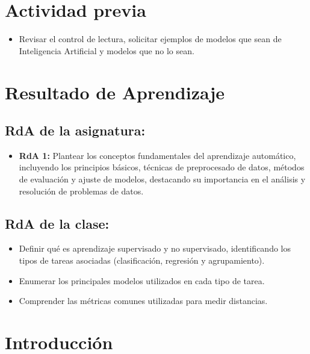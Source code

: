 \documentclass[a4,11pt]{aleph-notas}
\begin{document}
\encabezado

\section*{Actividad previa}

\begin{itemize}
    \item Revisar el control de lectura, solicitar ejemplos de modelos que sean de Inteligencia Artificial y modelos que no lo sean.
\end{itemize}

\section*{Resultado de Aprendizaje}

\subsection*{RdA de la asignatura:}
\begin{itemize}[leftmargin=*]
    \item \textbf{RdA 1:} Plantear los conceptos fundamentales del aprendizaje automático, incluyendo los principios básicos, técnicas de preprocesado de datos, métodos de evaluación y ajuste de modelos, destacando su importancia en el análisis y resolución de problemas de datos.
\end{itemize}

\subsection*{RdA de la clase:}
\begin{itemize}[leftmargin=*]
    \item Definir qué es aprendizaje supervisado y no supervisado, identificando los tipos de tareas asociadas (clasificación, regresión y agrupamiento).
    \item Enumerar los principales modelos utilizados en cada tipo de tarea.
    \item Comprender las métricas comunes utilizadas para medir distancias.
\end{itemize}

\section*{Introducción}
\end{document}
